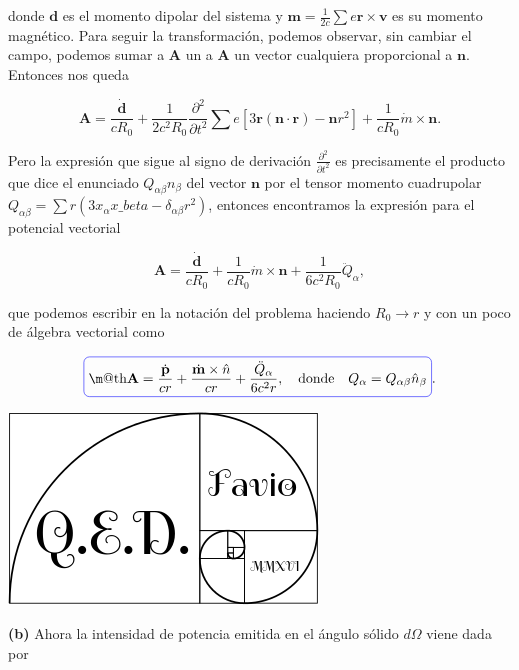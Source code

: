 \documentclass[a4paper,11pt]{article}
\makeatletter
\numberwithin{equation}{section}
\newcommand*{\boxcolor}{blue}
\renewcommand{\boxed}[1]{\textcolor{\boxcolor}{%
\tikz[baseline={([yshift=-1ex]current bounding box.center)}] \node [rectangle, minimum width=1ex,rounded corners,draw] {\normalcolor\m@th$\displaystyle#1$};}}
\makeatother
\begin{document}
donde $\mathbf{d}$ es el momento dipolar del sistema y $\mathbf{m} = \frac{1}{2c} 
\sum e \mathbf{r} \times \mathbf{v}$ es su momento magnético. Para seguir la 
transformación, podemos observar, sin cambiar el campo, podemos sumar a $\mathbf{A}$ 
un a $\mathbf{A}$ un vector cualquiera proporcional a $\mathbf{n}$. Entonces 
nos queda 

\begin{equation}
 \mathbf{A} = \frac{\dot{\mathbf{d}}}{cR_0} + \frac{1}{2c^2R_0}\frac{\partial^2}{ 
 \partial t^2}\sum e[3\mathbf{r}(\mathbf{n} \cdot \mathbf{r}) - \mathbf{n}r^2] + 
 \frac{1}{cR_0} \dot{m} \times \mathbf{n}.
\end{equation}

Pero la expresión que sigue al signo de derivación $\frac{\partial^2}{ 
\partial t^2}$ es precisamente el producto que dice el enunciado $Q_{\alpha\beta}n_\beta$ 
del vector $\mathbf{n}$ por el tensor momento cuadrupolar $Q_{\alpha\beta} = 
\sum r (3x_\alpha x\_beta - \delta_{\alpha\beta}r^2)$, entonces encontramos la 
expresión para el potencial vectorial 

\begin{equation}
 \mathbf{A} = \frac{\dot{\mathbf{d}}}{cR_0} + \frac{1}{cR_0}\dot{m}\times \mathbf{n} + 
 \frac{1}{6c^2R_0}\ddot{Q}_\alpha,
\end{equation}

que podemos escribir en la notación del problema haciendo $R_0 \rightarrow r$ y 
con un poco de álgebra vectorial como 

\begin{equation}
 \boxed{\mathbf{A} = \frac{\dot{\mathbf{p}}}{cr} + \frac{\dot{\mathbf{m}} \times 
 \hat{n}}{cr} + \frac{\ddot{Q}_{\alpha}}{6c^2r}, \quad \text{donde} \quad
 Q_\alpha = Q_{\alpha\beta} \hat{n}_\beta}.
\end{equation}

\hspace{10cm}\includegraphics[scale=0.25]{logoQED}

\textbf{(b)} Ahora la intensidad de potencia emitida en el ángulo sólido $d\Omega$ 
viene dada por 
\end{document}

